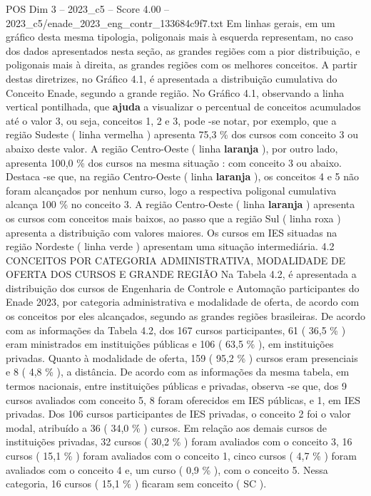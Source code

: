\begin{textsample}{POS Dim 3 – 2023\_c5 – Score 4.00 – 2023\_c5/enade\_2023\_eng\_contr\_133684c9f7.txt}
Em linhas gerais, em um gráfico desta mesma tipologia, poligonais mais à esquerda representam, no caso dos dados apresentados nesta seção, as grandes regiões com a pior distribuição, e poligonais mais à direita, as grandes regiões com os melhores conceitos.
A partir destas diretrizes, no Gráfico 4.1, é apresentada a distribuição cumulativa do Conceito Enade, segundo a grande região.
No Gráfico 4.1, observando a linha vertical pontilhada, que \textbf{ajuda} a visualizar o percentual de conceitos acumulados até o valor 3, ou seja, conceitos 1, 2 e 3, pode -se notar, por exemplo, que a região Sudeste ( linha vermelha ) apresenta 75,3 \% dos cursos com conceito 3 ou abaixo deste valor.
A região Centro-Oeste ( linha \textbf{laranja} ), por outro lado, apresenta 100,0 \% dos cursos na mesma situação : com conceito 3 ou abaixo.
Destaca -se que, na região Centro-Oeste ( linha \textbf{laranja} ), os conceitos 4 e 5 não foram alcançados por nenhum curso, logo a respectiva poligonal cumulativa alcança 100 \% no conceito 3.
A região Centro-Oeste ( linha \textbf{laranja} ) apresenta os cursos com conceitos mais baixos, ao passo que a região Sul ( linha roxa ) apresenta a distribuição com valores maiores.
Os cursos em IES situadas na região Nordeste ( linha verde ) apresentam uma situação intermediária. 4.2 CONCEITOS POR CATEGORIA ADMINISTRATIVA, MODALIDADE DE OFERTA DOS CURSOS E GRANDE REGIÃO Na Tabela 4.2, é apresentada a distribuição dos cursos de Engenharia de Controle e Automação participantes do Enade 2023, por categoria administrativa e modalidade de oferta, de acordo com os conceitos por eles alcançados, segundo as grandes regiões brasileiras.
De acordo com as informações da Tabela 4.2, dos 167 cursos participantes, 61 ( 36,5 \% ) eram ministrados em instituições públicas e 106 ( 63,5 \% ), em instituições privadas.
Quanto à modalidade de oferta, 159 ( 95,2 \% ) cursos eram presenciais e 8 ( 4,8 \% ), a distância.
De acordo com as informações da mesma tabela, em termos nacionais, entre instituições públicas e privadas, observa -se que, dos 9 cursos avaliados com conceito 5, 8 foram oferecidos em IES públicas, e 1, em IES privadas.
Dos 106 cursos participantes de IES privadas, o conceito 2 foi o valor modal, atribuído a 36 ( 34,0 \% ) cursos.
Em relação aos demais cursos de instituições privadas, 32 cursos ( 30,2 \% ) foram avaliados com o conceito 3, 16 cursos ( 15,1 \% ) foram avaliados com o conceito 1, cinco cursos ( 4,7 \% ) foram avaliados com o conceito 4 e, um curso ( 0,9 \% ), com o conceito 5.
Nessa categoria, 16 cursos ( 15,1 \% ) ficaram sem conceito ( SC ).

\end{textsample}
